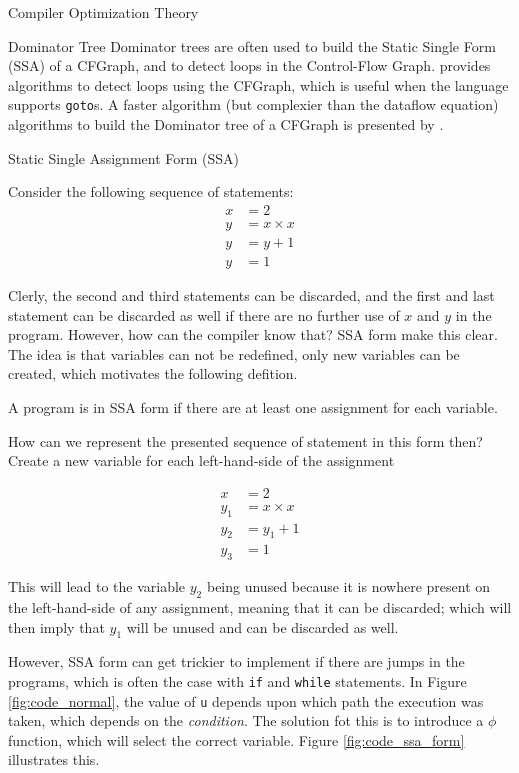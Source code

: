 \begin{section}{Compiler Optimization Theory}
\begin{subsection}{Dominator Tree}
	Dominator trees are often used to build the Static Single Form
	(SSA) of a CFGraph, and to detect loops in the Control-Flow
	Graph. \cite{appel2004modern} provides algorithms to detect
	loops using the CFGraph, which is useful when the language
	supports \texttt{goto}s. A faster algorithm
	(but complexier than the dataflow equation) algorithms to build
	the Dominator tree of a CFGraph is presented by
	\cite{georgiadis2006finding}.

\end{subsection}


\begin{subsection}{Static Single Assignment Form (SSA)}

Consider the following sequence of statements:
\begin{align}
x &= 2 \nonumber \\
y &= x \times x \nonumber \\
y &= y + 1 \nonumber \\
y &= 1 \nonumber
\end{align}

Clerly, the second and third statements can be discarded, and the first
and last statement can be discarded as well if there are no further use of $x$ and
$y$ in the program. However, how can the compiler know that? SSA form make
this clear. The idea is that variables can not be redefined, only new variables
can be created, which motivates the following defition.

\begin{definition}
	A program is in SSA form if there are at least one assignment for each
	variable.
\end{definition}

How can we represent the presented sequence of statement in this form then?
Create a new variable for each left-hand-side of the assignment

\begin{align}
x &= 2 \nonumber \\
y_1 &= x \times x \nonumber \\
y_2 &= y_1 + 1 \nonumber \\
y_3 &= 1 \nonumber
\end{align}

This will lead to the variable $y_2$ being unused because it is nowhere present
on the left-hand-side of any assignment, meaning that it can be discarded;
which will then imply that $y_1$ will be unused and can be discarded as well.

However, SSA form can get trickier to implement if there are jumps in the
programs, which is often the case with \texttt{if} and \texttt{while}
statements. In Figure \ref{fig:code_normal}, the value of \texttt{u}
depends upon which path the execution was taken, which depends on the
\textit{condition}. The solution fot this is to introduce a $\phi$
function, which will select the correct variable. Figure \ref{fig:code_ssa_form}
illustrates this.


\end{subsection}
\end{section}
